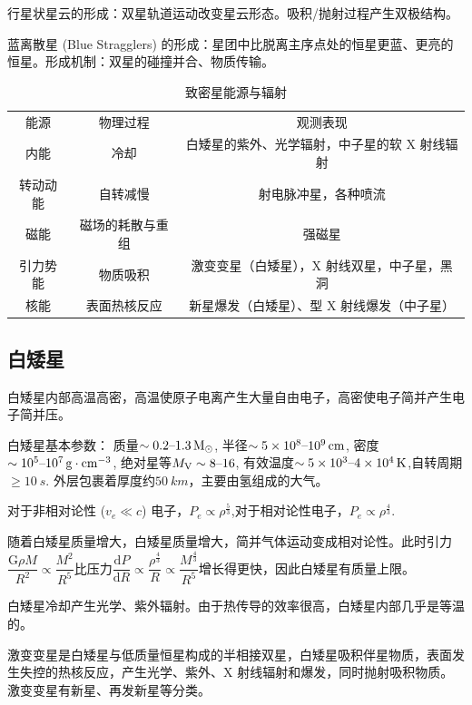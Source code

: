 \documentclass[../天体物理基础.tex]{subfiles}
\begin{document}
行星状星云的形成：双星轨道运动改变星云形态。吸积/抛射过程产生双极结构。

蓝离散星 (Blue Stragglers) 的形成：星团中比脱离主序点处的恒星更蓝、更亮的恒星。形成机制：双星的碰撞并合、物质传输。


\begin{table}[!htbp]
\centering
\caption{致密星能源与辐射}
\begin{tabular}{c c c}
\hline
能源 & 物理过程 & 观测表现\\
\cline{1-3}
内能 & 冷却 & 白矮星的紫外、光学辐射，中子星的软 X 射线辐射\\
\cline{1-3}
转动动能 & 自转减慢 & 射电脉冲星，各种喷流\\
\cline{1-3}
磁能 & 磁场的耗散与重组 & 强磁星\\
\cline{1-3}
引力势能 & 物质吸积 & 激变变星（白矮星），X 射线双星，中子星，黑洞\\
\cline{1-3}
核能 & 表面热核反应 & 新星爆发（白矮星）、\uppercase\expandafter{\romannumeral1}型 X 射线爆发（中子星）\\
\hline
\end{tabular}
\label{}
\end{table}


\subsection{白矮星}
白矮星内部高温高密，高温使原子电离产生大量自由电子，高密使电子简并产生电子简并压。

白矮星基本参数：
质量$\sim0.2\text{\textendash}1.3\,\unit{M_{\odot}}$, 半径$\sim5\times10^{8}\text{\textendash}10^{9}\,\unit{cm}$, 密度$\sim10^{5}\text{\textendash}10^{7}\,\unit{g\cdot cm^{-3}}$, 绝对星等$M_{\text{V}}\sim8\text{\textendash}16$, 有效温度$\sim5\times10^{3}\text{\textendash}4\times10^{4}\,\unit{K}$,自转周期$\ge\qty{10}{s}$. 外层包裹着厚度约$\qty{50}{km}$，主要由氢组成的大气。

对于非相对论性 ($v_{e}\ll c$) 电子，$P_{e}\propto\rho^{\frac{5}{3}}$,对于相对论性电子，$P_{e}\propto\rho^{\frac{4}{3}}$.

随着白矮星质量增大，白矮星质量增大，简并气体运动变成相对论性。此时引力$\dfrac{\mathrm{G}\rho{}M}{R^{2}}\propto{}\dfrac{M^{2}}{R^{5}}$比压力$\dfrac{\mathrm{d}P}{\mathrm{d}R}\propto{}\dfrac{\rho^{\frac{4}{3}}}{R}\propto{}\dfrac{M^{\frac{4}{3}}}{R^{5}}$增长得更快，因此白矮星有质量上限。

白矮星冷却产生光学、紫外辐射。由于热传导的效率很高，白矮星内部几乎是等温的。

激变变星是白矮星与低质量恒星构成的半相接双星，白矮星吸积伴星物质，表面发生失控的热核反应，产生光学、紫外、X 射线辐射和爆发，同时抛射吸积物质。激变变星有新星、再发新星等分类。
\end{document}
